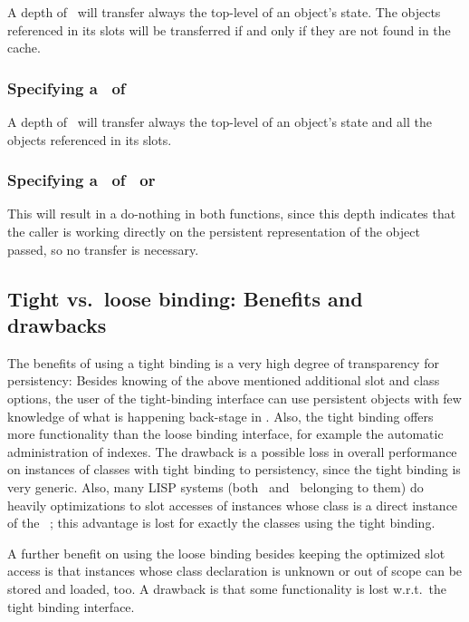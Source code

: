 A depth of \ will transfer always the top-level of an
object's state.  The objects referenced in its slots will be
transferred if and only if they are not found in the cache.

\subsubsection{Specifying a \protect{}\ of
  \protect{}}

A depth of \ will transfer always the top-level of an
object's state and all the objects referenced in its slots.

\subsubsection{Specifying a \protect{}\ of
  \protect{}\ or \protect{}}

This will result in a do-nothing in both functions, since this depth
indicates that the caller is working directly on the persistent
representation of the object passed, so no transfer is necessary.

\subsection[Tight vs. loose binding]{Tight vs.\ loose binding:
  Benefits and drawbacks}

The benefits of using a tight binding is a very high degree of
transparency for persistency: Besides knowing of the above mentioned
additional slot and class options, the user of the tight-binding
interface can use persistent objects with few knowledge of what is
happening back-stage in \plobwoexcl. Also, the tight binding offers
more functionality than the loose binding interface, for example the
automatic administration of indexes.  The drawback is a possible loss
in overall performance on instances of classes with tight binding to
persistency, since the tight binding is very generic. Also, many LISP
systems (both \lwcl\ and \allegrocl\ belonging to them) do heavily
optimizations to slot accesses of instances whose class is a direct
instance of the \clsmc\ ; this advantage is lost
for exactly the classes using the tight binding.

A further benefit on using the loose binding besides keeping the
optimized slot access is that instances whose class declaration is
unknown or out of scope can be stored and loaded, too. A drawback is
that some functionality is lost w.r.t.\ the tight binding interface.

